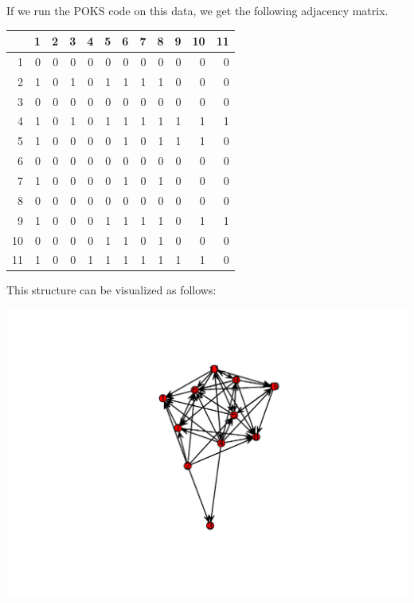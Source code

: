 \documentclass[11pt]{article}\usepackage[]{graphicx}\usepackage[]{color}
\makeatletter
\def\maxwidth{ %
  \ifdim\Gin@nat@width>\linewidth
    \linewidth
  \else
    \Gin@nat@width
  \fi
}
\newenvironment{knitrout}{}{} %
\makeatother
\begin{document}
If we run the POKS code on this data, we get the following adjacency matrix.\\
\begin{tabular}{rrrrrrrrrrrr}
  \hline
 & 1 & 2 & 3 & 4 & 5 & 6 & 7 & 8 & 9 & 10 & 11 \\ 
  \hline
1 & 0 & 0 & 0 & 0 & 0 & 0 & 0 & 0 & 0 & 0 & 0 \\ 
  2 & 1 & 0 & 1 & 0 & 1 & 1 & 1 & 1 & 0 & 0 & 0 \\ 
  3 & 0 & 0 & 0 & 0 & 0 & 0 & 0 & 0 & 0 & 0 & 0 \\ 
  4 & 1 & 0 & 1 & 0 & 1 & 1 & 1 & 1 & 1 & 1 & 1 \\ 
  5 & 1 & 0 & 0 & 0 & 0 & 1 & 0 & 1 & 1 & 1 & 0 \\ 
  6 & 0 & 0 & 0 & 0 & 0 & 0 & 0 & 0 & 0 & 0 & 0 \\ 
  7 & 1 & 0 & 0 & 0 & 0 & 1 & 0 & 1 & 0 & 0 & 0 \\ 
  8 & 0 & 0 & 0 & 0 & 0 & 0 & 0 & 0 & 0 & 0 & 0 \\ 
  9 & 1 & 0 & 0 & 0 & 1 & 1 & 1 & 1 & 0 & 1 & 1 \\ 
  10 & 0 & 0 & 0 & 0 & 1 & 1 & 0 & 1 & 0 & 0 & 0 \\ 
  11 & 1 & 0 & 0 & 1 & 1 & 1 & 1 & 1 & 1 & 1 & 0 \\ 
   \hline
\end{tabular}

This structure can be visualized as follows:\\
\begin{knitrout}
\color{fgcolor}

{\centering \includegraphics[width=\maxwidth]{figure/poks-graph-1} 

}



\end{knitrout}
\end{document}
